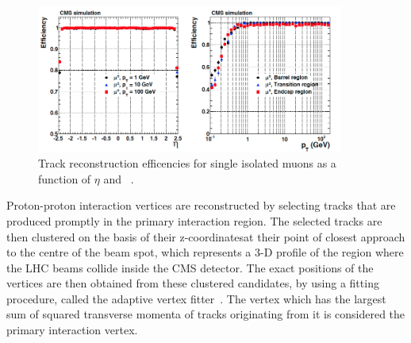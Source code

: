 \begin{figure}
\begin{center}
\includegraphics[width=0.9\textwidth,keepaspectratio]{plots_and_figures/chapter4/trackrecon.png}
\caption{Track reconstruction efficencies for single isolated muons as a function of $\eta$ and \pt~\cite{track_reconstruction}.}
\label{fig:trackrecon}
\end{center}
\end{figure}


Proton-proton interaction vertices are reconstructed by selecting tracks that are produced promptly in the primary interaction region. The selected tracks are then clustered on the basis of their z-coordinatesat their point of closest approach to the centre of the beam spot, which represents a 3-D profile of the region where the LHC beams collide inside the CMS detector. The exact positions of the vertices are then obtained from these clustered candidates, by using a fitting procedure, called the adaptive vertex fitter~\cite{vertex_fitting}. The vertex which has the largest sum of squared transverse momenta of tracks originating from it is considered the primary interaction vertex. 


